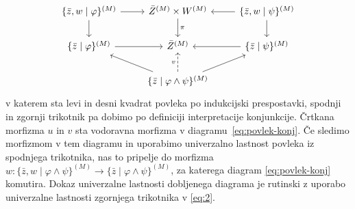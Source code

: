 \documentclass[../kategoricna_logika.tex]{subfiles}
\begin{document}
\begin{dokaz}
\begin{itemize}
\begin{equation}
\begin{tikzcd}
    \{\bar{z},w \mid \varphi \}^{(M)} \ar[d] \ar[r] & \bar{Z}^{(M)} \times W^{(M)} \ar[d, "\pi"] & \{\bar{z}, w \mid \psi\}^{(M)} \ar[l] \ar[d] \\
    \{\bar{z} \mid \varphi \}^{(M)} \ar[r] & \bar{Z}^{(M)} & \{\bar{z} \mid \psi \}^{(M)} \ar[l] \\
    & \{\bar{z} \mid \varphi \land \psi \}^{(M)} \ar[ul] \ar[u, dashed, "v"] \ar[ur] &
  \end{tikzcd}
\end{equation}
v katerem sta levi in desni kvadrat povleka po indukcijski prespostavki, spodnji in zgornji trikotnik
pa dobimo po definiciji interpretacije konjunkcije. Črtkana morfizma $u$ in $v$ sta vodoravna morfizma
v diagramu~\eqref{eq:povlek-konj}. Če sledimo morfizmom v tem diagramu in uporabimo univerzalno lastnost
povleka iz spodnjega trikotnika, nas to pripelje do morfizma $w : \{\bar{z},w \mid \varphi \land \psi\}^{(M)} \to \{\bar{z} \mid \varphi \land \psi\}^{(M)}$, za katerega diagram \eqref{eq:povlek-konj} komutira.
Dokaz univerzalne lastnosti dobljenega diagrama je rutinski z uporabo univerzalne lastnosti zgornjega trikotnika
v \eqref{eq:2}.


\end{itemize}
\end{dokaz}
\end{document}
